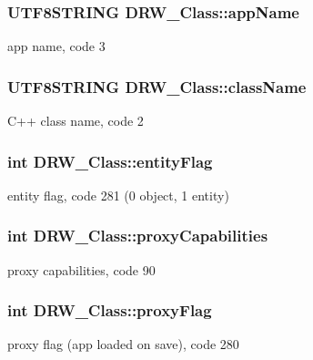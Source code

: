 \subsubsection[{app\+Name}]{\setlength{\rightskip}{0pt plus 5cm}U\+T\+F8\+S\+T\+R\+I\+N\+G D\+R\+W\+\_\+\+Class\+::app\+Name}\label{class_d_r_w___class_a15b27bae29a5245c739f3de255e65760}
app name, code 3 \hypertarget{class_d_r_w___class_acde079b8bf4ff8e12ddbb592d492a22f}{}
\subsubsection[{class\+Name}]{\setlength{\rightskip}{0pt plus 5cm}U\+T\+F8\+S\+T\+R\+I\+N\+G D\+R\+W\+\_\+\+Class\+::class\+Name}\label{class_d_r_w___class_acde079b8bf4ff8e12ddbb592d492a22f}
C++ class name, code 2 \hypertarget{class_d_r_w___class_ab6d13ec9b7720e2b04533d0adbb6b1f6}{}
\subsubsection[{entity\+Flag}]{\setlength{\rightskip}{0pt plus 5cm}int D\+R\+W\+\_\+\+Class\+::entity\+Flag}\label{class_d_r_w___class_ab6d13ec9b7720e2b04533d0adbb6b1f6}
entity flag, code 281 (0 object, 1 entity) \hypertarget{class_d_r_w___class_a6a472aad89b499e5b0dd4a5c2c07b735}{}
\subsubsection[{proxy\+Capabilities}]{\setlength{\rightskip}{0pt plus 5cm}int D\+R\+W\+\_\+\+Class\+::proxy\+Capabilities}\label{class_d_r_w___class_a6a472aad89b499e5b0dd4a5c2c07b735}
proxy capabilities, code 90 \hypertarget{class_d_r_w___class_a093a40e69719110340d4954cdcfde582}{}
\subsubsection[{proxy\+Flag}]{\setlength{\rightskip}{0pt plus 5cm}int D\+R\+W\+\_\+\+Class\+::proxy\+Flag}\label{class_d_r_w___class_a093a40e69719110340d4954cdcfde582}
proxy flag (app loaded on save), code 280 \hypertarget{class_d_r_w___class_ac3470fefc02faf7f2eb5dff1dac7af9a}{}
